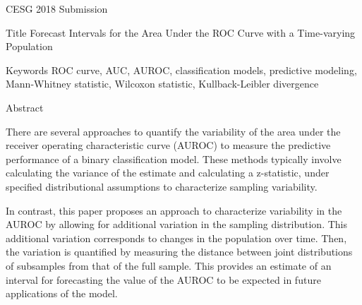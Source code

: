 CESG 2018 Submission

Title
Forecast Intervals for the Area Under the ROC Curve with a Time-varying Population


Keywords
ROC curve, AUC, AUROC, classification models, predictive modeling, Mann-Whitney statistic, Wilcoxon statistic, Kullback-Leibler divergence


Abstract

There are several approaches to quantify the variability of the area under the receiver operating characteristic curve (AUROC) to measure the predictive performance of a binary classification model. These methods typically involve calculating the variance of the estimate and calculating a z-statistic, under specified distributional assumptions to characterize sampling variability.

In contrast, this paper proposes an approach to characterize variability in the AUROC by allowing for additional variation in the sampling distribution. This additional variation corresponds to changes in the population over time. Then, the variation is quantified by measuring the distance between joint distributions of subsamples from that of the full sample. This provides an estimate of an interval for forecasting the value of the AUROC to be expected in future applications of the model.

